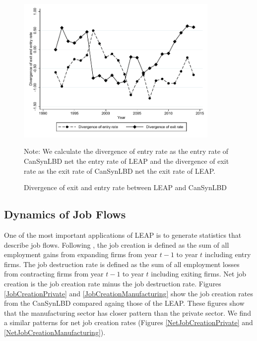 \documentclass{article}
\begin{document}
\begin{figure} [H]
\centering
\caption{Divergence of exit and entry rate between LEAP and CanSynLBD} \label{Divergence}
\includegraphics[height=2.8in, width=.7\linewidth]{graphs/Divergence_of_exit_and_entry_rate_between_LEAP_and_CanSynLBD_bw.pdf} 
\begin{minipage}{0.85\textwidth}
{\footnotesize Note: \TableNote  We calculate the divergence of entry rate as the entry rate of CanSynLBD net the entry rate of LEAP and the divergence of exit rate as the exit rate of CanSynLBD net the exit rate of LEAP. \par}
\end{minipage}
\end{figure}

\subsection{Dynamics of Job Flows}

One of the most important applications of LEAP is to generate statistics that describe job flows. Following \cite{DavisHaltiwangerSchuh}, the job creation is defined as the sum of all employment gains from expanding firms from year $t-1$ to year $t$ including entry firms. The job destruction rate is defined as the sum of all employment losses from contracting firms from year $t-1$ to year $t$ including exiting firms. Net job creation is the job creation rate minus the job destruction rate. Figures \ref{JobCreationPrivate} and \ref{JobCreationManufacturing} show the job creation rates from the CanSynLBD compared againg those of the LEAP. These figures show that the manufacturing sector has closer pattern than the private sector. We find a similar patterns for net job creation rates (Figures \ref{NetJobCreationPrivate} and  \ref{NetJobCreationManufacturing}).
\end{document}
